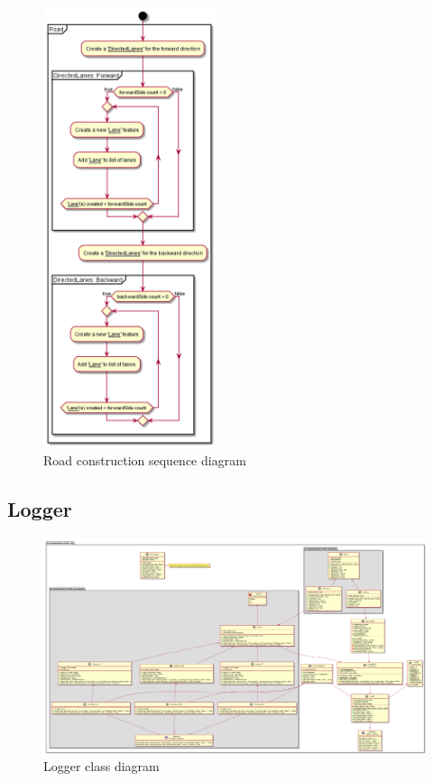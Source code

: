 \begin{figure}[h]
  	\caption{Road construction sequence diagram}
  	\label{fig:roadConstructSeqDiag}
  	\centering
  	\includegraphics[width=0.45\textwidth]{figs/graphConstruction/RoadConstruction.png}
\end{figure}


\subsection{Logger}
\begin{figure}
  	\caption{Logger class diagram}
  	\label{fig:loogerClassDiag}
  	\centering
  	\includegraphics[width=\textheight - 2em]{figs/logger/logModuleClassDiagram.png}
\end{figure}



